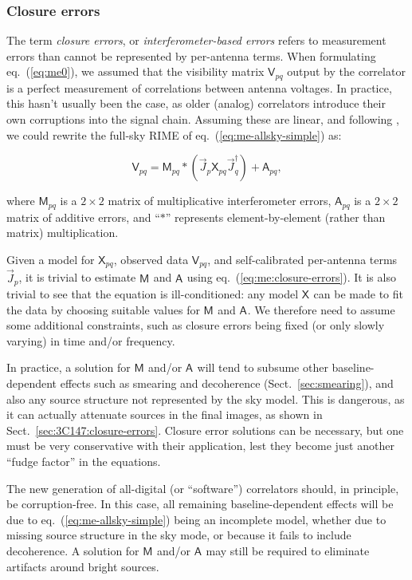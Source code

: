 \documentclass[]{aa}
\newcommand{\jones}[2]{\vec {#1}_{#2}}
\newcommand{\jonesT}[2]{\vec {#1}^\dagger_{#2}}
\newcommand{\coh}[2]{\mathsf{{#1}}_{{#2}}}
\begin{document}
\subsubsection{\label{sec:closure-errors}Closure errors}

The term {\em closure errors}, or {\em interferometer-based errors} refers to measurement errors than cannot be represented by per-antenna terms. When formulating eq.~(\ref{eq:me0}), we assumed that the visibility matrix $\coh{V}{pq}$ output by the correlator is a perfect measurement of correlations between antenna voltages. In practice, this hasn't usually been the case, as older (analog) correlators introduce their own corruptions into the signal chain. Assuming these are linear, and following \citet{JEN:note185}, we could rewrite the full-sky RIME of eq.~(\ref{eq:me-allsky-simple}) as: 

    \begin{equation}\label{eq:me:closure-errors}
    \coh{V}{pq} = \coh{M}{pq} \ast ( \jones{J}{p} \coh{X}{pq}  \jonesT{J}{q} ) + \coh{A}{pq},
    \end{equation}

where $\coh{M}{pq}$ is a $2\times2$ matrix of multiplicative interferometer errors, $\coh{A}{pq}$ is a $2\times2$ matrix of additive errors, and ``$\ast$'' represents element-by-element (rather than matrix) multiplication.

Given a model for $\coh{X}{pq}$, observed data $\coh{V}{pq}$, and self-calibrated per-antenna terms $\jones{J}{p}$, it is trivial to estimate $\coh{M}{}$ and $\coh{A}{}$ using eq.~(\ref{eq:me:closure-errors}). It is also trivial to see that the equation is ill-conditioned: any model $\coh{X}{}$ can be made to fit the data by choosing suitable values for $\coh{M}{}$ and $\coh{A}{}$. We therefore need to assume some additional constraints, such as closure errors being fixed (or only slowly varying) in time and/or frequency. 

In practice, a solution for $\coh{M}{}$ and/or $\coh{A}{}$ will tend to subsume other baseline-dependent effects such as smearing and decoherence (Sect.~\ref{sec:smearing}), and also any source structure not represented by the sky model. This is dangerous, as it can actually attenuate sources in the final images, as shown in Sect.~\ref{sec:3C147:closure-errors}. Closure error solutions can be necessary, but one must be very conservative with their application, lest they become just another ``fudge factor'' in the equations.

The new generation of all-digital (or ``software'') correlators should, in principle, be corruption-free. In this case, all remaining baseline-dependent effects will be due to eq.~(\ref{eq:me-allsky-simple}) being an incomplete model, whether due to missing source structure in the sky mode, or because it fails to include decoherence. A solution for $\coh{M}{}$ and/or $\coh{A}{}$ may still be required to eliminate artifacts around bright sources.
\end{document}

